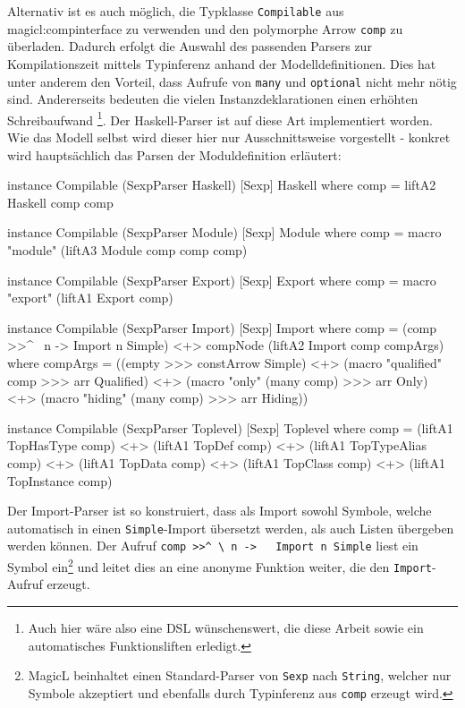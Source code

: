 \documentclass[11pt, a4paper, bibgerm]{scrbook}
\newcommand\icode[1]{\lstinline?#1?}
\newcommand\sref{}
\begin{document}
Alternativ ist es auch möglich, die Typklasse \icode{Compilable} aus
\sref{magicl:compinterface} zu verwenden und den polymorphe
Arrow \icode{comp} zu überladen. Dadurch erfolgt die Auswahl des
passenden Parsers zur Kompilationszeit mittels Typinferenz anhand der
Modelldefinitionen. Dies hat unter anderem den Vorteil, dass Aufrufe von
\icode{many} und \icode{optional} nicht mehr nötig sind. Andererseits
bedeuten die vielen Instanzdeklarationen einen erhöhten Schreibaufwand
\footnote{Auch hier wäre also eine DSL wünschenswert, die diese Arbeit
  sowie ein automatisches Funktionsliften erledigt.}. Der Haskell-Parser
ist auf diese Art implementiert worden. Wie das Modell selbst wird
dieser hier nur Ausschnittsweise vorgestellt - konkret wird
hauptsächlich das Parsen der Moduldefinition erläutert:
\begin{code}
instance Compilable (SexpParser Haskell) [Sexp] Haskell where
    comp = liftA2 Haskell comp comp

instance Compilable (SexpParser Module) [Sexp] Module where
    comp = macro "module" (liftA3 Module comp comp comp)

instance Compilable (SexpParser Export) [Sexp] Export where
    comp = macro "export" (liftA1 Export comp)

instance Compilable (SexpParser Import) [Sexp] Import where
    comp  = (comp >>^ \ n -> Import n Simple) <+>
             compNode (liftA2 Import comp compArgs)
        where compArgs =
                  ((empty >>> constArrow Simple)               <+>
                   (macro "qualified" comp >>> arr Qualified)  <+>
                   (macro "only" (many comp) >>> arr Only)     <+>
                   (macro "hiding" (many comp) >>> arr Hiding))

instance Compilable (SexpParser Toplevel) [Sexp] Toplevel where
    comp = (liftA1 TopHasType comp)   <+>
           (liftA1 TopDef comp)       <+>
           (liftA1 TopTypeAlias comp) <+>
           (liftA1 TopData comp)      <+>
           (liftA1 TopClass comp)     <+>
           (liftA1 TopInstance comp)
\end{code}
Der Import-Parser ist so konstruiert, dass als Import sowohl Symbole,
welche automatisch in einen \icode{Simple}-Import übersetzt werden, als
auch Listen übergeben werden können. Der Aufruf \icode{comp >>^ \ n ->
  Import n Simple} liest ein Symbol ein\footnote{MagicL beinhaltet einen
Standard-Parser von \icode{Sexp} nach \icode{String}, welcher nur
Symbole akzeptiert und ebenfalls durch Typinferenz aus \icode{comp}
erzeugt wird.} und leitet dies an eine anonyme Funktion weiter, die den
\icode{Import}-Aufruf erzeugt.
\end{document}
